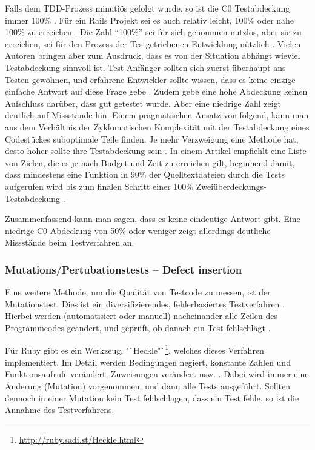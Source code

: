  Falls dem TDD-Prozess minutiös gefolgt wurde, so ist die C0 Testabdeckung immer 100\% \citep{beck_test_2002}. Für ein Rails Projekt sei es auch relativ leicht, 100\% oder nahe 100\% zu erreichen \citep{rappin_rails_2011}. Die Zahl "`100\%"' sei für sich genommen nutzlos, aber sie zu erreichen, sei für den Prozess der Testgetriebenen Entwicklung nützlich \citep[S. 270]{rappin_rails_2011}. Vielen Autoren bringen aber zum Ausdruck, dass es von der Situation abhängt \citep{infoq_2007} wieviel Testabdeckung sinnvoll ist. Test-Anfänger sollten sich zuerst überhaupt ans Testen gewöhnen, und erfahrene Entwickler sollte wissen, dass es keine einzige einfache Antwort auf diese Frage gebe \citep{infoq_2007}. Zudem gebe eine hohe Abdeckung keinen Aufschluss darüber, dass gut getestet wurde. Aber eine niedrige Zahl zeigt deutlich auf Missstände hin. Einem pragmatischen Ansatz von \citeauthor{alberto_savoia_code_2007} folgend, kann man aus dem Verhältnis der Zyklomatischen Komplexität mit der Testabdeckung eines Codestückes suboptimale Teile finden. Je mehr Verzweigung eine Methode hat, desto höher sollte ihre Testabdeckung sein \citep{alberto_savoia_code_2007}. In einem Artikel empfiehlt \citeauthor*{steve_cornett_code_1996} eine Liste von Zielen, die es je nach Budget und Zeit zu erreichen gilt, beginnend damit, dass mindestens eine Funktion in 90\% der Quelltextdateien durch die Tests aufgerufen wird bis zum finalen Schritt einer 100\% Zweiüberdeckungs-Testabdeckung \citep{steve_cornett_code_1996}.

 Zusammenfassend kann man sagen, dass es keine eindeutige Antwort gibt. Eine niedrige C0 Abdeckung von 50\% oder weniger zeigt allerdings deutliche Missstände beim Testverfahren an.

 \subsubsection{Mutations/Pertubationstests -- Defect insertion}
 \label{sec:mutation}
 Eine weitere Methode, um die Qualität von Testcode zu messen, ist der Mutationstest. Dies ist ein diversifizierendes, fehlerbasiertes Testverfahren \citep{liggesmeyer_modultest_1990}. Hierbei werden (automatisiert oder manuell) nacheinander alle Zeilen des Programmcodes geändert, und geprüft, ob danach ein Test fehlschlägt \citep{beck_test_2002}.

 Für Ruby gibt es ein Werkzeug, "`Heckle"`\footnote{\url{http://ruby.sadi.st/Heckle.html}}, welches dieses Verfahren implementiert. Im Detail werden Bedingungen negiert, konstante Zahlen und Funktionsaufrufe verändert, Zuweisungen verändert usw. \citep{ruby_sadists_confessions_2010}. Dabei wird immer eine Änderung (Mutation) vorgenommen, und dann alle Tests ausgeführt. Sollten dennoch in einer Mutation kein Test fehlschlagen, dass ein Test fehle, so ist die Annahme des Testverfahrens.

